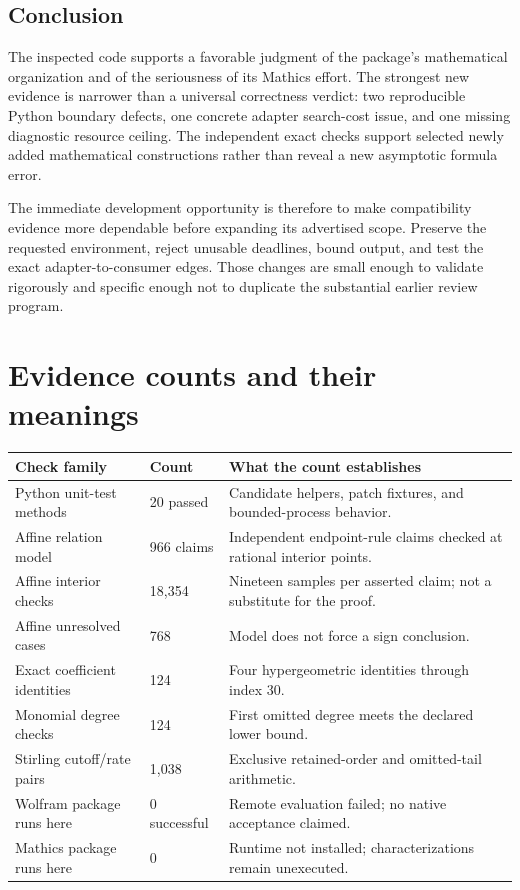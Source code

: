 \documentclass[11pt,letterpaper]{article}
\begin{document}
\subsection{Conclusion}

The inspected code supports a favorable judgment of the package's mathematical organization and of the seriousness of its Mathics effort. The strongest new evidence is narrower than a universal correctness verdict: two reproducible Python boundary defects, one concrete adapter search-cost issue, and one missing diagnostic resource ceiling. The independent exact checks support selected newly added mathematical constructions rather than reveal a new asymptotic formula error.

The immediate development opportunity is therefore to make compatibility evidence more dependable before expanding its advertised scope. Preserve the requested environment, reject unusable deadlines, bound output, and test the exact adapter-to-consumer edges. Those changes are small enough to validate rigorously and specific enough not to duplicate the substantial earlier review program.

\appendix
\section{Evidence counts and their meanings}

\begin{center}\small
\begin{tabularx}{\textwidth}{@{}P{2.45in}P{0.9in}Y@{}}
\toprule
Check family & Count & What the count establishes \\
\midrule
Python unit-test methods & 20 passed & Candidate helpers, patch fixtures, and bounded-process behavior. \\
Affine relation model & 966 claims & Independent endpoint-rule claims checked at rational interior points. \\
Affine interior checks & 18,354 & Nineteen samples per asserted claim; not a substitute for the proof. \\
Affine unresolved cases & 768 & Model does not force a sign conclusion. \\
Exact coefficient identities & 124 & Four hypergeometric identities through index 30. \\
Monomial degree checks & 124 & First omitted degree meets the declared lower bound. \\
Stirling cutoff/rate pairs & 1,038 & Exclusive retained-order and omitted-tail arithmetic. \\
Wolfram package runs here & 0 successful & Remote evaluation failed; no native acceptance claimed. \\
Mathics package runs here & 0 & Runtime not installed; characterizations remain unexecuted. \\
\bottomrule
\end{tabularx}
\end{center}
\end{document}
